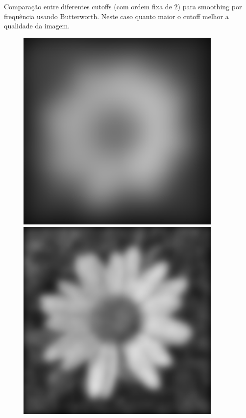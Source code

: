 \documentclass[a4paper]{report}
\begin{document}
Comparação entre diferentes cutoffs (com ordem fixa de 2) para smoothing por frequência usando Butterworth. Neste caso quanto maior o cutoff melhor a qualidade da imagem.
\begin{figure}[H]
\centering
\begin{minipage}{.3\textwidth}
  \centering
    \includegraphics[width=0.9\textwidth]{images/Smooth/frequency-salt-n-pepper/flower_smooth_frequency_Butterworth_2_5.png}
\end{minipage}%
\begin{minipage}{.3\textwidth}
  \centering
    \includegraphics[width=0.9\textwidth]{images/Smooth/frequency-salt-n-pepper/flower_smooth_frequency_Butterworth_2_20.png}

\end{minipage}
\end{figure}
\end{document}

